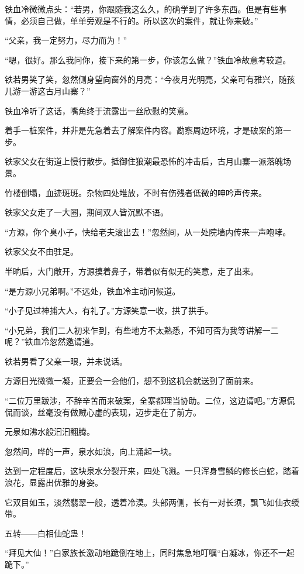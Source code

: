 \begin{this_body}
铁血冷微微点头：“若男，你跟随我这么久，的确学到了许多东西。但是有些事情，必须自己做，单单旁观是不行的。所以这次的案件，就让你来破。”

“父亲，我一定努力，尽力而为！”

“嗯，很好。那么我问你，接下来的第一步，你该怎么做？”铁血冷故意考较道。

铁若男笑了笑，忽然侧身望向窗外的月亮：“今夜月光明亮，父亲可有雅兴，随孩儿游一游这古月山寨？”

铁血冷听了这话，嘴角终于流露出一丝欣慰的笑意。

着手一桩案件，并非是先急着去了解案件内容。勘察周边环境，才是破案的第一步。

铁家父女在街道上慢行散步。抵御住狼潮最恐怖的冲击后，古月山寨一派落魄场景。

竹楼倒塌，血迹斑斑。杂物四处堆放，不时有伤残者低微的呻吟声传来。

铁家父女走了一大圈，期间双人皆沉默不语。

“方源，你个臭小子，快给老夫滚出去！”忽然间，从一处院墙内传来一声咆哮。

铁家父女不由驻足。

半晌后，大门敞开，方源摸着鼻子，带着似有似无的笑意，走了出来。

“是方源小兄弟啊。”不远处，铁血冷主动问候道。

“小子见过神捕大人，有礼了。”方源笑意一收，拱了拱手。

“小兄弟，我们二人初来乍到，有些地方不太熟悉，不知可否为我等讲解一二呢？”铁血冷忽然邀请道。

铁若男看了父亲一眼，并未说话。

方源目光微微一凝，正要会一会他们，想不到这机会就送到了面前来。

“二位万里跋涉，不辞辛苦而来破案，全寨都理当协助。二位，这边请吧。”方源侃侃而谈，丝毫没有做贼心虚的表现，迈步走在了前方。

元泉如沸水般汩汩翻腾。

忽然间，哗的一声，泉水如浪，向上涌起一块。

达到一定程度后，这块泉水分裂开来，四处飞溅。一只浑身雪鳞的修长白蛇，踏着浪花，显露出优雅的身姿。

它双目如玉，淡然翡翠一般，透着冷漠。头部两侧，长有一对长须，飘飞如仙衣绶带。

五转——白相仙蛇蛊！

“拜见大仙！”白家族长激动地跪倒在地上，同时焦急地叮嘱“白凝冰，你还不一起跪下。”


\end{this_body}
